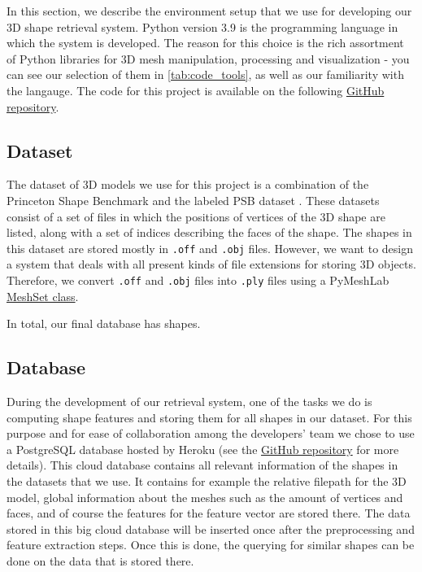In this section, we describe the environment setup that we use for developing our 3D shape retrieval system.
Python version 3.9 is the programming language in which the system is developed.
The reason for this choice is the rich assortment of Python libraries for 3D mesh manipulation, processing and
visualization - you can see our selection of them in \ref{tab:code_tools}, as well as our familiarity with the langauge.
The code for this project is available on the following  \href{https://github.com/cristi2019255/MultimediaRetrieval}{GitHub repository}.

\subsection{Dataset}
The dataset of 3D models we use for this project is a combination of the Princeton Shape
Benchmark \cite{Princeton} and the labeled PSB dataset \cite{PSB_dataset,PSB_paper}.
These datasets consist of a set of files in which the positions of vertices of the 3D shape are listed, along with a
set of indices describing the faces of the shape.
The shapes in this dataset are stored mostly in \verb!.off! and \verb!.obj! files.
However, we want to design a system that deals with all present kinds of file extensions for storing 3D objects.
Therefore, we convert \verb!.off! and \verb!.obj! files into \verb!.ply! files using a PyMeshLab \href{https://pymeshlab.readthedocs.io/en/latest/classes/meshset.html}{MeshSet class}.

In total, our final database has {} shapes.
\subsection{Database}
During the development of our retrieval system, one of the tasks we do is computing shape features and storing them
for all shapes in our dataset.
For this purpose and for ease of collaboration among the developers' team we chose to use a PostgreSQL database
hosted by Heroku (see the \href{https://github.com/cristi2019255/MultimediaRetrieval}{GitHub repository} for more
details).
This cloud database contains all relevant information of the shapes in the datasets that we use.
It contains for example the relative filepath for the 3D model, global information about the meshes such as the
amount of vertices and faces, and of course the features for the feature vector are stored there.
The data stored in this big cloud database will be inserted once after the preprocessing and feature extraction steps.
Once this is done, the querying for similar shapes can be done on the data that is stored there.

